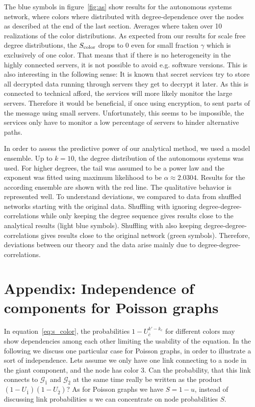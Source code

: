 \documentclass[aps, pre, onecolumn, a4paper, floatfix]{revtex4}
\begin{document}
The blue symbols in figure~\ref{fig:as} show results for the autonomous systems network, where colors 
where distributed with degree-dependence over the nodes as described at the end of the last section. 
Averages where taken over 10 realizations of the color distributions. As expected from our results 
for scale free degree distributions, the $S_{\rm color}$ drops to 0 even for small fraction $\gamma$ 
which is exclusively of one color. That means that if there is no heterogeneity in the highly 
connected servers, it is not possible to avoid e.g. software versions. This is also 
interesting in the following sense: It is known that secret services try to store all decrypted data 
running through servers they get to decrypt it later. As this is connected to technical afford, 
the services will more likely monitor the large servers. Therefore it would be beneficial, if once 
using encryption, to sent parts of the message using small servers. Unfortunately, this seems to 
be impossible, the services only have to monitor a low percentage of servers to hinder alternative 
paths. 

In order to assess the predictive power of our analytical method, we used a model ensemble. Up to 
$k=10$, the degree distribution of the autonomous systems was used. For higher degrees, the tail 
was assumed to be a power law and the exponent was fitted using maximum likelihood to be 
$\alpha \approx2.0304$. Results for the according ensemble are shown with the red line. The qualitative 
behavior is represented well. To understand deviations, we compared to data from shuffled networks 
starting with the original data. Shuffling with ignoring degree-degree-correlations while only 
keeping the degree sequence gives results close to the analytical results (light blue symbols).  
Shuffling with also keeping degree-degree-correlations gives results close to the original network 
(green symbols). 
Therefore, deviations between our theory and the data arise mainly due to degree-degree-correlations. 





\section*{Appendix: Independence of components for Poisson graphs}

In equation~\ref{eq:s_color}, the probabilities $1-U_{\bar c}^{k'-k_c}$ for 
different colors may show dependencies 
among each other limiting the usability of the equation. In the following we 
discuss one particular case for Poisson graphs, in order to illustrate a sort 
of independence. Lets assume we only have one link connecting to a node in the 
giant component, and the node has color 3. Can the probability, that this link connects 
to ${\mathcal G}_{\bar 1}$ and ${\mathcal G}_{\bar 2}$ at the same time 
really be written as the product $(1-U_{\bar 1})(1-U_{\bar 2})$? 
As for Poisson graphs we 
have $S=1-u$, instead of discussing link probabilities $u$ we can concentrate on 
node probabilities $S$. 
\end{document}
